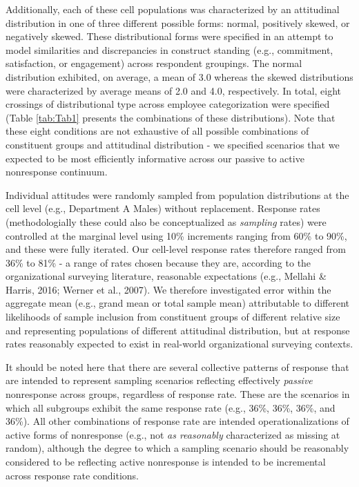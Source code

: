 \documentclass[
  man,mask]{apa7}
\begin{document}
Additionally, each of these cell populations was characterized by an attitudinal distribution in one of three different possible forms: normal, positively skewed, or negatively skewed. These distributional forms were specified in an attempt to model similarities and discrepancies in construct standing (e.g., commitment, satisfaction, or engagement) across respondent groupings. The normal distribution exhibited, on average, a mean of 3.0 whereas the skewed distributions were characterized by average means of 2.0 and 4.0, respectively. In total, eight crossings of distributional type across employee categorization were specified (Table \ref{tab:Tab1} presents the combinations of these distributions). Note that these eight conditions are not exhaustive of all possible combinations of constituent groups and attitudinal distribution - we specified scenarios that we expected to be most efficiently informative across our passive to active nonresponse continuum.

Individual attitudes were randomly sampled from population distributions at the cell level (e.g., Department A Males) without replacement. Response rates (methodologially these could also be conceptualized as \emph{sampling} rates) were controlled at the marginal level using 10\% increments ranging from 60\% to 90\%, and these were fully iterated. Our cell-level response rates therefore ranged from 36\% to 81\% - a range of rates chosen because they are, according to the organizational surveying literature, reasonable expectations (e.g., Mellahi \& Harris, 2016; Werner et al., 2007). We therefore investigated error within the aggregate mean (e.g., grand mean or total sample mean) attributable to different likelihoods of sample inclusion from constituent groups of different relative size and representing populations of different attitudinal distribution, but at response rates reasonably expected to exist in real-world organizational surveying contexts.

It should be noted here that there are several collective patterns of response that are intended to represent sampling scenarios reflecting effectively \emph{passive} nonresponse across groups, regardless of response rate. These are the scenarios in which all subgroups exhibit the same response rate (e.g., 36\%, 36\%, 36\%, and 36\%). All other combinations of response rate are intended operationalizations of active forms of nonresponse (e.g., not \emph{as reasonably} characterized as missing at random), although the degree to which a sampling scenario should be reasonably considered to be reflecting active nonresponse is intended to be incremental across response rate conditions.
\end{document}
